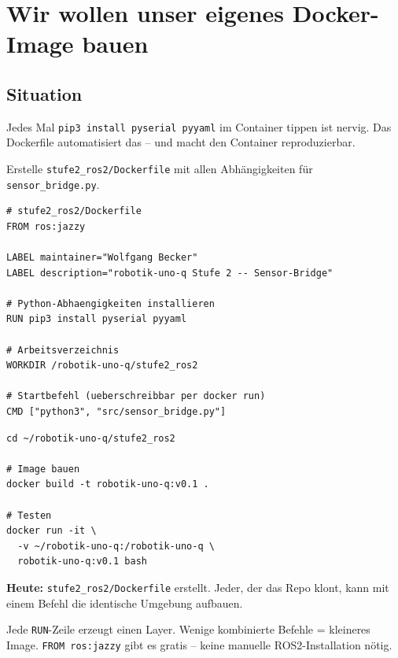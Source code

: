 \chapter{Wir wollen unser eigenes Docker-Image bauen}

\kapitelstruktur

\section{Situation}

Jedes Mal \texttt{pip3 install pyserial pyyaml} im Container
tippen ist nervig. Das Dockerfile automatisiert das -- und
macht den Container reproduzierbar.

\begin{aufgabeBox}
Erstelle \texttt{stufe2\_ros2/Dockerfile} mit allen
Abhängigkeiten für \texttt{sensor\_bridge.py}.
\end{aufgabeBox}

\begin{lstlisting}[style=dockerfile]
# stufe2_ros2/Dockerfile
FROM ros:jazzy

LABEL maintainer="Wolfgang Becker"
LABEL description="robotik-uno-q Stufe 2 -- Sensor-Bridge"

# Python-Abhaengigkeiten installieren
RUN pip3 install pyserial pyyaml

# Arbeitsverzeichnis
WORKDIR /robotik-uno-q/stufe2_ros2

# Startbefehl (ueberschreibbar per docker run)
CMD ["python3", "src/sensor_bridge.py"]
\end{lstlisting}

\begin{lstlisting}[style=bash]
cd ~/robotik-uno-q/stufe2_ros2

# Image bauen
docker build -t robotik-uno-q:v0.1 .

# Testen
docker run -it \
  -v ~/robotik-uno-q:/robotik-uno-q \
  robotik-uno-q:v0.1 bash
\end{lstlisting}

\begin{projektBox}
\textbf{Heute:} \texttt{stufe2\_ros2/Dockerfile} erstellt.
Jeder, der das Repo klont, kann mit einem Befehl die
identische Umgebung aufbauen.
\end{projektBox}

\begin{merksatzBox}
Jede \texttt{RUN}-Zeile erzeugt einen Layer.
Wenige kombinierte Befehle = kleineres Image.
\texttt{FROM ros:jazzy} gibt es gratis -- keine manuelle
ROS2-Installation nötig.
\end{merksatzBox}


